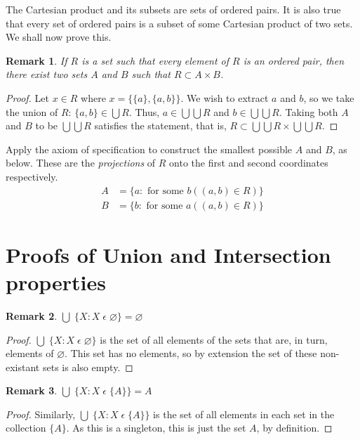 \documentclass[12pt]{article}
\newtheorem{remark}{Remark}
\begin{document}
The Cartesian product and its subsets are sets of ordered pairs. It is also true that every set of
ordered pairs is a subset of some Cartesian product of two sets. We shall now prove this.
\begin{remark}
    If $R$ is a set such that every element of $R$ is an ordered pair, then there exist two sets $A$
    and $B$ such that $R \subset A \times B$.
\end{remark}
\begin{proof}
    Let $x \in R$ where $x = \{\{a\}, \{a, b\}\}$. We wish to extract $a$ and $b$, so we take the union
    of $R$: $\{a, b\} \in \bigcup R$. Thus, $a \in \bigcup \bigcup R$ and $b \in \bigcup \bigcup R$.
    Taking both $A$ and $B$ to be $\bigcup \bigcup R$ satisfies the statement, that is, $R \subset
    \bigcup \bigcup R \times \bigcup \bigcup R$.
\end{proof}
Apply the axiom of specification to construct the smallest possible $A$ and $B$, as below. These are
the \textit{projections} of $R$ onto the first and second coordinates respectively.
\begin{align*}
    A &= \{a: \text{ for some } b ((a, b) \in R)\}\\
    B &= \{b: \text{ for some } a ((a, b) \in R)\}
\end{align*}






\appendix
\section{Proofs of Union and Intersection properties}\label{Appendix: Unions and Intersections proofs}
\begin{remark}
    $\bigcup\;\{X: X\;\epsilon\;\varnothing\} = \varnothing$
\end{remark}
\begin{proof}
    $\bigcup\;\{X: X\;\epsilon\;\varnothing\}$ is the set of all elements of the sets that are, in turn,
    elements of $\varnothing$. This set has no elements, so by extension the set of these non-existant
    sets is also empty.
\end{proof}

\begin{remark}
    $\bigcup\;\{X: X\;\epsilon\;\{A\}\} = A$
\end{remark}
\begin{proof}
    Similarly, $\bigcup\;\{X: X\;\epsilon\;\{A\}\}$ is the set of all elements in each set in the
    collection $\{A\}$. As this is a singleton, this is just the set $A$, by definition.
\end{proof}
\end{document}

